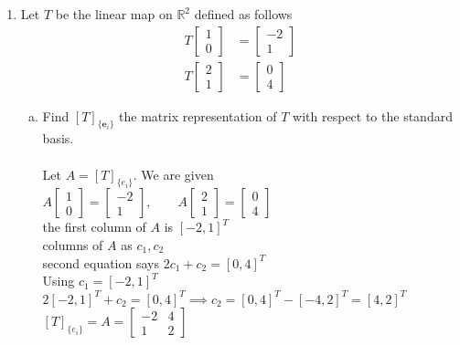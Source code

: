 \documentclass{article}
\begin{document}
{{\begin{enumerate}
\newpage\item Let $T$ be the linear map on $\mathbb{R}^2$ defined as follows
\begin{eqnarray*}
T\left[
\begin{array}{cc}
1 \\
0
\end{array}\right]&=\left[
\begin{array}{cc}
-2 \\
1
\end{array}\right]\\
T\left[
\begin{array}{cc}
2 \\
1
\end{array}\right]&=\left[
\begin{array}{cc}
0 \\
4
\end{array}\right]
\end{eqnarray*}
\begin{enumerate}[a.]
\item Find $[T]_{\{\textbf{e}_i\}}$ the matrix representation of $T$ with respect to the standard basis.
\\
\\Let $A=[T]_{\{e_i\}}$. We are given
\\$A\begin{bmatrix}1\\0\end{bmatrix}=\begin{bmatrix}-2\\1\end{bmatrix}, \qquad A\begin{bmatrix}2\\1\end{bmatrix}=\begin{bmatrix}0\\4\end{bmatrix}$
\\the first column of $A$ is $[-2,1]^T$
\\columns of $A$ as $c_1,c_2$
\\second equation says $2c_1+c_2=[0,4]^T$
\\Using $c_1=[-2,1]^T$
\\$2[-2,1]^T + c_2 = [0,4]^T \implies c_2 = [0,4]^T - [-4,2]^T = [4,2]^T$
\\$[T]_{\{e_i\}} = A=\begin{bmatrix}-2 & 4\\[4pt] 1 & 2\end{bmatrix}$


\end{enumerate}
\end{enumerate}}}
\end{document}
